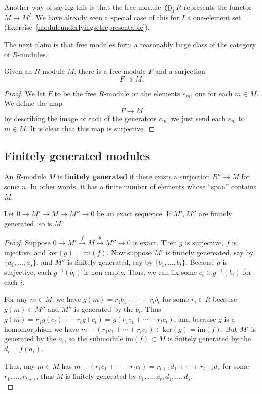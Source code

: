 Another way of saying this is that the free module $\bigoplus_I R$ represents
the functor $M \to M^I$. We have already seen a special case of this for $I$ a
one-element set (Exercise~\ref{moduleunderlyingsetrepresentable}).

The next claim is that free modules form a reasonably large class of the
category of $R$-modules.

\begin{proposition} 
Given an $R$-module $M$, there is a free module $F$ and a surjection
\[ F \twoheadrightarrow M.  \]
\end{proposition} 
\begin{proof} 
We let $F$ to be the free $R$-module on the elements $e_m$, one for each $m
\in M$. We define the map
\[ F \to M  \]
by describing the image of each of the generators $e_m$: we just send each
$e_m$ to $m \in M$. It is clear that this map is surjective.
\end{proof} 

\subsection{Finitely generated modules}

\begin{definition} 
An $R$-module $M$ is \textbf{finitely generated} if there exists a surjection
$R^n \to M$ for some $n$. In other words, it has a finite number of elements
whose ``span'' contains $M$.
\end{definition} 

\begin{proposition} 
Let $0 \to M' \to M \to M'' \to 0$ be an exact sequence. If $M', M''$ are
finitely generated, so is $M$.
\end{proposition} 
\begin{proof} 
Suppose $0\rightarrow
M'\stackrel{f}{\rightarrow}M\stackrel{g}{\rightarrow}M''\rightarrow0$
is exact. Then $g$ is surjective, $f$ is injective, and
$\text{ker}(g)=\text{im}(f)$. Now suppose $M'$ is finitely genereated,
say by $\{a_1,\ldots,a_s\}$, and $M''$ is finitely generated, say by
$\{b_1,\ldots,b_t\}$. Because $g$ is surjective, each $g^{-1}(b_i)$ is
non-empty. Thus, we can fix some $c_i\in g^{-1}(b_i)$ for each $i$.

For any
$m\in M$, we have $g(m)=r_1b_1+\cdots+r_tb_t$ for some $r_i\in R$ because
$g(m)\in M''$ and $M''$ is generated by the $b_i$. Thus $g(m)=r_1g(c_i)+\cdots
r_tg(c_t)=g(r_1c_1+\cdots+r_tc_t)$, and because $g$ is a homomorphism
we have $m-(r_1c_1+\cdots+r_tc_t)\in\text{ker}(g)=\text{im}(f)$. But
$M'$ is generated by the $a_i$, so the submodule $\text{im}(f)\subset
M$ is finitely generated by the $d_i=f(a_i)$.

Thus, any $m\in
M$ has $m-(r_1c_1+\cdots+r_tc_t)=r_{t+1}d_1+\cdots+r_{t+s}d_s$
for some $r_1,\ldots,r_{t+s}$, thus $M$ is finitely generated by
$c_1,\ldots,c_t,d_1,\ldots,d_s$.  \\

\end{proof} 

